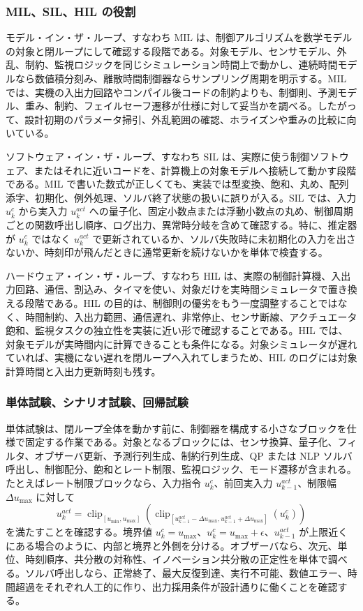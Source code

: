 \subsubsection{MIL、SIL、HIL の役割}

モデル・イン・ザ・ループ、すなわち MIL は、制御アルゴリズムを数学モデルの対象と閉ループにして確認する段階である。対象モデル、センサモデル、外乱、制約、監視ロジックを同じシミュレーション時間上で動かし、連続時間モデルなら数値積分刻み、離散時間制御器ならサンプリング周期を明示する。MIL では、実機の入出力回路やコンパイル後コードの制約よりも、制御則、予測モデル、重み、制約、フェイルセーフ遷移が仕様に対して妥当かを調べる。したがって、設計初期のパラメータ掃引、外乱範囲の確認、ホライズンや重みの比較に向いている。

ソフトウェア・イン・ザ・ループ、すなわち SIL は、実際に使う制御ソフトウェア、またはそれに近いコードを、計算機上の対象モデルへ接続して動かす段階である。MIL で書いた数式が正しくても、実装では型変換、飽和、丸め、配列添字、初期化、例外処理、ソルバ終了状態の扱いに誤りが入る。SIL では、入力 $u_k^c$ から実入力 $u_k^{act}$ への量子化、固定小数点または浮動小数点の丸め、制御周期ごとの関数呼出し順序、ログ出力、異常時分岐を含めて確認する。特に、推定器が $u_k^c$ ではなく $u_k^{act}$ で更新されているか、ソルバ失敗時に未初期化の入力を出さないか、時刻印が飛んだときに通常更新を続けないかを単体で検査する。

ハードウェア・イン・ザ・ループ、すなわち HIL は、実際の制御計算機、入出力回路、通信、割込み、タイマを使い、対象だけを実時間シミュレータで置き換える段階である。HIL の目的は、制御則の優劣をもう一度調整することではなく、時間制約、入出力範囲、通信遅れ、非常停止、センサ断線、アクチュエータ飽和、監視タスクの独立性を実装に近い形で確認することである。HIL では、対象モデルが実時間内に計算できることも条件になる。対象シミュレータが遅れていれば、実機にない遅れを閉ループへ入れてしまうため、HIL のログには対象計算時間と入出力更新時刻も残す。

\subsubsection{単体試験、シナリオ試験、回帰試験}

単体試験は、閉ループ全体を動かす前に、制御器を構成する小さなブロックを仕様で固定する作業である。対象となるブロックには、センサ換算、量子化、フィルタ、オブザーバ更新、予測行列生成、制約行列生成、QP または NLP ソルバ呼出し、制御配分、飽和とレート制限、監視ロジック、モード遷移が含まれる。たとえばレート制限ブロックなら、入力指令 $u_k^c$、前回実入力 $u_{k-1}^{act}$、制限幅 $\Delta u_{\max}$ に対して
\begin{equation}
  u_k^{act}
  =
  \operatorname{clip}_{[u_{\min},u_{\max}]}
  \left(
  \operatorname{clip}_{[u_{k-1}^{act}-\Delta u_{\max},
                       u_{k-1}^{act}+\Delta u_{\max}]}
  (u_k^c)
  \right)
\end{equation}
を満たすことを確認する。境界値 $u_k^c=u_{\max}$、$u_k^c=u_{\max}+\epsilon$、$u_{k-1}^{act}$ が上限近くにある場合のように、内部と境界と外側を分ける。オブザーバなら、次元、単位、時刻順序、共分散の対称性、イノベーション共分散の正定性を単体で調べる。ソルバ呼出しなら、正常終了、最大反復到達、実行不可能、数値エラー、時間超過をそれぞれ人工的に作り、出力採用条件が設計通りに働くことを確認する。

